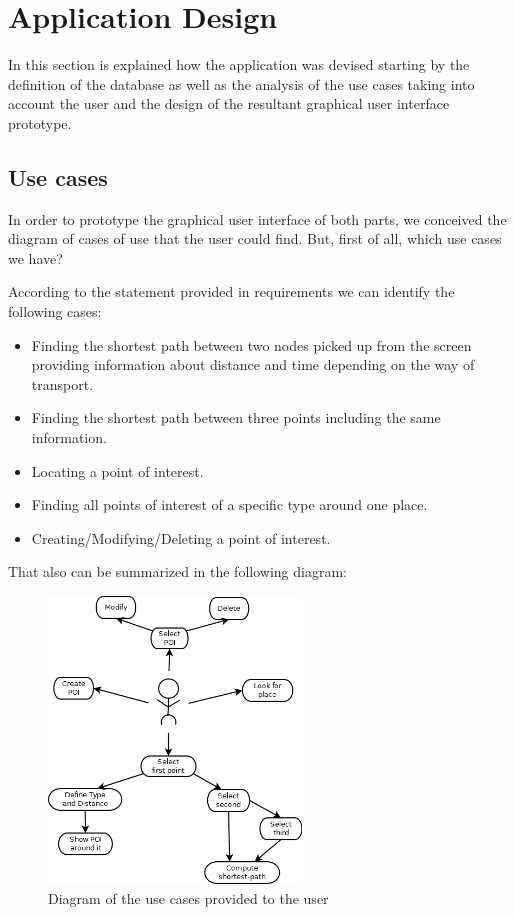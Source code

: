 \documentclass{article}
\begin{document}
\clearpage
\section{Application Design}
In this section is explained how the application was devised starting by the definition of the database as well as the analysis of the use cases taking into account the user and the design of the resultant graphical user interface prototype.

\subsection{Use cases} \label{use_cases}
In order to prototype the graphical user interface of both parts, we conceived the diagram of cases of use that the user could find. But, first of all, which use cases we have?

According to the statement provided in requirements we can identify the following cases:

\begin{itemize}
  \item Finding the shortest path between two nodes picked up from the screen providing information about distance and time depending on the way of transport.
  \item Finding the shortest path between three points including the same information.
  \item Locating a point of interest.
  \item Finding all points of interest of a specific type around one place.
  \item Creating/Modifying/Deleting a point of interest.
\end{itemize}

That also can be summarized in the following diagram:

\begin{figure}[h]
\centering
\includegraphics[width=0.6\textwidth]{use_cases.png}
\caption{Diagram of the use cases provided to the user}
\end{figure}
\end{document}
